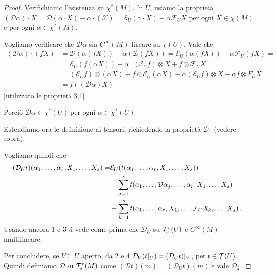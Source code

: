 \begin{proof}
	Verifichiamo l'esistenza su $\chi^*(M)$. In $U$, usiamo la proprietà $(\mathcal D\alpha)\cdot X = \mathcal D(\alpha\cdot X) - \alpha\cdot(\mathcal X) = \mathcal E_U(\alpha\cdot X) - \alpha \mathcal F_UX$ per ogni $X\in\chi(M)$ e per ogni $\alpha \in \chi^*(M)$.
	
	Vogliamo verificare che $\mathcal D\alpha$ sia $C^\infty(M)$-lineare su $\chi(U)$.
	Vale che
	\begin{align*}
		(\mathcal D\alpha) \cdot (fX) &= \mathcal D (\alpha(fX)) -\alpha(\mathcal D(fX)) = \mathcal E_U(\alpha(fX)) - \alpha\mathcal F_U(fX)=\\
		&= \mathcal E_U(f(\alpha X)) - \alpha [(\mathcal E_Uf)\otimes X + f \otimes \mathcal F_UX] = \\
		&= (\mathcal E_U f)\otimes (\alpha X) + f \otimes \mathcal E_U (\alpha X) - \alpha (\mathcal E_U f) \otimes X - \alpha f \otimes F_U X = \\
		&= f((\mathcal D\alpha) X)
	\end{align*}
	[utilizzato le proprietà 3,1] %
	
	Perciò $\mathcal D\alpha \in \chi^*(U)$ per ogni $\alpha\in\chi^*(U)$.

Estendiamo ora le definizione ai tensori, richiedendo la proprietà $\mathcal D_1$ (vedere sopra).

Vogliamo quindi che
\begin{align*}
	(\mathcal D_U t) (\alpha_1,\ldots,\alpha_r,X_1,\ldots,X_s) =& \mathcal E_U(t(\alpha_1,\ldots,\alpha_r,X_1,\ldots,X_s)) -\\
	&-\sum_{j=1}^rt(\alpha_1,\ldots, \mathcal D\alpha_j,\ldots,\alpha_r,X_1,\ldots,X_s) -\\
	&- \sum_{k=1}^s t(\alpha_1,\ldots,\alpha_r,X_1,\ldots,\mathcal F_UX_k,\ldots,X_s)\, \text{. }
\end{align*}
Usando ancora 1 e 3 si vede come prima che $\mathcal D_U$ su $\mathcal T_s^r(U)$ è $C^\infty(M)$-multilineare.

Per concludere, se $V\subseteq U$ aperto, da 2 e 4 $\mathcal D_V(t|_ U) = (\mathcal D_U t)|_ V$, per $t\in\mathcal T(U)$.
Quindi definiamo $\mathcal D$ su $\mathcal T_s^r(M)$ come $(\mathcal D t) (m) = (\mathcal D_U t) (m)$ e vale $\mathcal D_2$.
\end{proof}

